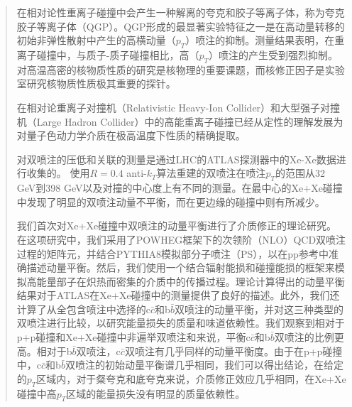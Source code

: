 \begin{abstract}
  在相对论性重离子碰撞中会产生一种解离的夸克和胶子等离子体，称为夸克胶子等离子体（QGP）。QGP形成的最显著实验特征之一是在高动量转移的初始非弹性散射中产生的高横动量（$p_T$）喷注的抑制。测量结果表明，在重离子碰撞中，与质子-质子碰撞相比，高（$p_T$）喷注的产生受到强烈抑制。
  对高温高密的核物质性质的研究是核物理的重要课题，而核修正因子是实验室研究核物质性质极其重要的探针。

  在相对论重离子对撞机（Relativistic Heavy-Ion Collider）和大型强子对撞机（Large Hadron Collider）中的高能重离子碰撞已经从定性的理解发展为对量子色动力学介质在极高温度下性质的精确提取。


  对双喷注的压低和关联的测量是通过LHC的ATLAS探测器中的Xe-Xe数据进行收集的。
  使用$R=0.4$ anti-$k_T$算法重建的双喷注在喷注$p_T$的范围从32 GeV到398 GeV以及对撞的中心度上有不同的测量。在最中心的Xe+Xe碰撞中发现了明显的双喷注动量不平衡，而在更边缘的碰撞中则有所减少。

  我们首次对Xe+Xe碰撞中双喷注的动量平衡进行了介质修正的理论研究。在这项研究中，我们采用了POWHEG框架下的次领阶（NLO）QCD双喷注过程的矩阵元，并结合PYTHIA8模拟部分子喷注（PS），以在pp参考中准确描述动量平衡。然后，我们使用一个结合辐射能损和碰撞能损的框架来模拟高能量部子在炽热而密集的介质中的传播过程。理论计算得出的动量平衡结果对于ATLAS在Xe+Xe碰撞中的测量提供了良好的描述。此外，我们还计算了从全包含喷注中选择的c$\bar{c}$和b$\bar{b}$双喷注的动量平衡，并对这三种类型的双喷注进行比较，以研究能量损失的质量和味道依赖性。我们观察到相对于p+p碰撞和Xe+Xe碰撞中非遍举双喷注和来说，平衡c$\bar{c}$和b$\bar{b}$双喷注的比例更高。相对于b$\bar{b}$双喷注，c$\bar{c}$双喷注有几乎同样的动量平衡度。由于在p+p碰撞中，c$\bar{c}$和b$\bar{b}$双喷注的初始动量平衡谱几乎相同，我们可以得出结论，在给定的$p_T$区域内，对于粲夸克和底夸克来说，介质修正效应几乎相同，在Xe+Xe碰撞中高$p_T$区域的能量损失没有明显的质量依赖性。










\end{abstract}



